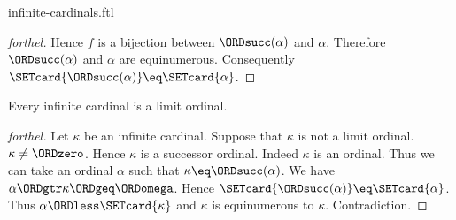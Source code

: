 \documentclass{naproche-library}
\begin{document}
\begin{smodule}[title=Infinite Cardinal Numbers]{infinite-cardinals.ftl}
\begin{proof}[forthel]
  Hence $f$ is a bijection between $\ORDsucc(\alpha)$ and $\alpha$.
  Therefore $\ORDsucc(\alpha)$ and $\alpha$ are equinumerous.
  Consequently $\SETcard{\ORDsucc(\alpha)} \eq \SETcard{\alpha}$.
\end{proof}

\begin{proposition}[forthel,id=SET_THEORY_07_8700732632989696]
  Every infinite cardinal is a limit ordinal.
\end{proposition}
\begin{proof}[forthel]
  Let $\kappa$ be an infinite cardinal.
  Suppose that $\kappa$ is not a limit ordinal.
  $\kappa \neq \ORDzero$.
  Hence $\kappa$ is a successor ordinal.
  Indeed $\kappa$ is an ordinal.
  Thus we can take an ordinal $\alpha$ such that $\kappa \eq \ORDsucc(\alpha)$.
  We have $\alpha \ORDgtr \kappa \ORDgeq \ORDomega$.
  Hence $\SETcard{\ORDsucc(\alpha)} \eq \SETcard{\alpha}$.
  Thus $\alpha \ORDless \SETcard{\kappa}$ and $\kappa$ is equinumerous to $\kappa$.
  Contradiction.
\end{proof}
\end{smodule}
\end{document}
